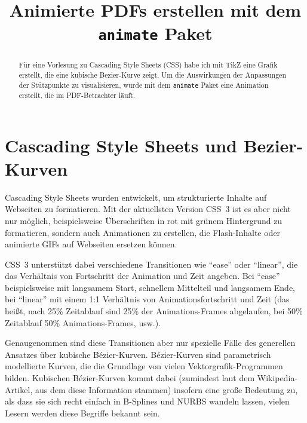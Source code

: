 \documentclass[ngerman]{dtk}%
\begin{document}
\title{Animierte PDFs erstellen mit dem \texttt{animate} Paket}


\maketitle


\begin{abstract}
Für eine Vorlesung zu Cascading Style Sheets (CSS) habe ich mit TikZ eine Grafik erstellt, die eine kubische Bezier-Kurve zeigt. Um die Auswirkungen der Anpassungen der Stützpunkte zu visualisieren, wurde mit dem \texttt{animate} Paket eine Animation erstellt, die im PDF-Betrachter läuft.
\end{abstract}

\section{Cascading Style Sheets und Bezier-Kurven}

Cascading Style Sheets wurden entwickelt, um strukturierte Inhalte auf Webseiten zu formatieren.  Mit der aktuellsten Version CSS~3 ist es aber nicht nur möglich, beispielsweise Überschriften in rot mit grünem Hintergrund zu formatieren, sondern auch Animationen zu erstellen, die Flash-Inhalte oder animierte GIFs auf Webseiten ersetzen können. 

CSS~3 unterstützt dabei verschiedene Transitionen wie \enquote{ease} oder \enquote{linear}, die das Verhältnis von Fortschritt der Animation und Zeit angeben. Bei \enquote{ease} beispielsweise mit langsamem Start, schnellem Mittelteil und langsamem Ende, bei \enquote{linear} mit einem 1:1 Verhältnis von Animationsfortschritt und Zeit (das heißt, nach 25\% Zeitablauf sind 25\% der Animations-Frames abgelaufen, bei 50\% Zeitablauf 50\% Animations-Frames, usw.).

Genaugenommen sind diese Transitionen aber nur spezielle Fälle des generellen Ansatzes über kubische Bézier-Kurven. Bézier-Kurven sind parametrisch modellierte Kurven, die die Grundlage von vielen Vektorgrafik-Programmen bilden. Kubischen Bézier-Kurven kommt dabei (zumindest laut dem Wikipedia-Artikel, aus dem diese Information stammen) insofern eine große Bedeutung zu, als dass sie sich recht einfach in B-Splines und NURBS wandeln lassen, vielen Lesern werden diese Begriffe bekannt sein.
\end{document}
